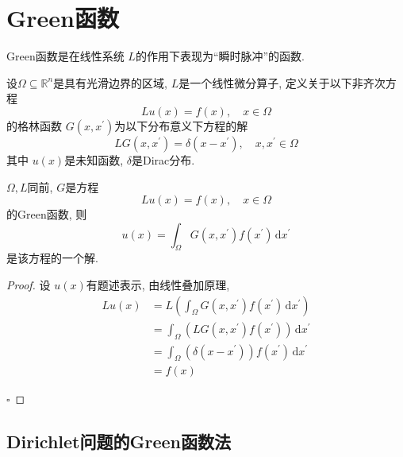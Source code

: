 \documentclass[../../main.tex]{subfiles}
\begin{document}
\chapter{ Green函数 }



Green函数是在线性系统 \(  L  \)的作用下表现为“瞬时脉冲”的函数. 

\begin{definition}
    设\(   \Omega \subseteq \mathbb{R} ^{n}  \)是具有光滑边界的区域, \(  L  \)是一个线性微分算子, 定义关于以下非齐次方程 \[
    Lu\left( x \right)= f\left( x \right)  ,\quad x\in  \Omega 
    \] 的格林函数 \(  G\left( x,x^{\prime}  \right)   \)为以下分布意义下方程的解 \[
    LG\left( x,x^{\prime}  \right)=  \delta \left( x-x^{\prime}  \right)  ,\quad x,x^{\prime} \in  \Omega 
    \] 其中 \(  u\left( x \right)   \)是未知函数, \(   \delta   \)是Dirac分布.  
\end{definition}

\begin{theorem}\label{6.7-1}
   \(   \Omega ,L \)同前, \(  G  \)是方程 \[
   Lu\left( x \right)= f\left( x \right),\quad x\in  \Omega   
   \]的Green函数, 则 \[
   u\left( x \right)= \int_{ \Omega }G\left( x,x^{\prime}  \right)f\left( x^{\prime}  \right)  \,\mathrm{d} x^{\prime}  
   \]   是该方程的一个解.
\end{theorem}

\begin{proof}
    设 \(  u\left( x \right)   \)有题述表示, 由线性叠加原理, \[
    \begin{aligned}
    Lu\left( x \right)&= L \left( \int_{ \Omega }G\left( x,x^{\prime}  \right)f\left( x^{\prime}  \right)   \,\mathrm{d} x^{\prime}\right) \\ 
     &=  \int_{ \Omega } \left( LG\left( x,x^{\prime}  \right)  f\left( x^{\prime}  \right) \right)\,\mathrm{d} x^{\prime} \\ 
      &=  \int_{ \Omega }\left(  \delta \left( x-x^{\prime}  \right)  \right)f\left( x^{\prime}  \right)\,\mathrm{d} x^{\prime} \\ 
       &= f\left( x \right)   
    \end{aligned}  
    \]

    \hfill $\square$
\end{proof}

\section{Dirichlet问题的Green函数法}
\end{document}

